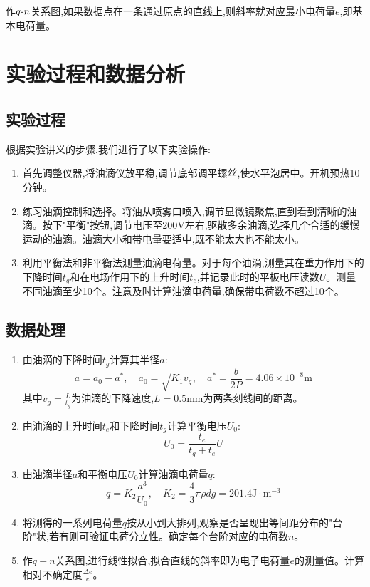 \documentclass[UTF8]{ctexart}
\begin{document}
作$q\textup{-}n$关系图,如果数据点在一条通过原点的直线上,则斜率就对应最小电荷量$e$,即基本电荷量。


\section{实验过程和数据分析}

\subsection{实验过程}

根据实验讲义的步骤,我们进行了以下实验操作:
\begin{enumerate}
  \item 首先调整仪器,将油滴仪放平稳,调节底部调平螺丝,使水平泡居中。开机预热10分钟。
  \item 练习油滴控制和选择。将油从喷雾口喷入,调节显微镜聚焦,直到看到清晰的油滴。按下"平衡"按钮,调节电压至200V左右,驱散多余油滴,选择几个合适的缓慢运动的油滴。油滴大小和带电量要适中,既不能太大也不能太小。
  \item 利用平衡法和非平衡法测量油滴电荷量。对于每个油滴,测量其在重力作用下的下降时间$t_g$和在电场作用下的上升时间$t_e$,并记录此时的平板电压读数$U$。测量不同油滴至少10个。注意及时计算油滴电荷量,确保带电荷数不超过10个。
\end{enumerate}

\subsection{数据处理}

\begin{enumerate}
  \item 由油滴的下降时间$t_g$计算其半径$a$:
  $$a=a_0-a^*,\quad a_0=\sqrt{K_1v_g},\quad a^*=\frac{b}{2P}=4.06\times10^{-8}\mathrm{m}$$
  其中$v_g=\frac{L}{t_g}$为油滴的下降速度,$L=0.5\mathrm{mm}$为两条刻线间的距离。
  
  \item 由油滴的上升时间$t_e$和下降时间$t_g$计算平衡电压$U_0$:
  $$U_0=\frac{t_e}{t_g+t_e}U$$
  
  \item 由油滴半径$a$和平衡电压$U_0$计算油滴电荷量$q$:
  $$q=K_2\frac{a^3}{U_0},\quad K_2=\frac{4}{3}\pi\rho dg=201.4\mathrm{J\cdot m^{-3}}$$
  
  \item 将测得的一系列电荷量$q$按从小到大排列,观察是否呈现出等间距分布的"台阶"状,若有则可验证电荷分立性。确定每个台阶对应的电荷数$n$。
  
  \item 作$q-n$关系图,进行线性拟合,拟合直线的斜率即为电子电荷量$e$的测量值。计算相对不确定度$\frac{\Delta e}{e}$。
\end{enumerate}
\end{document}
